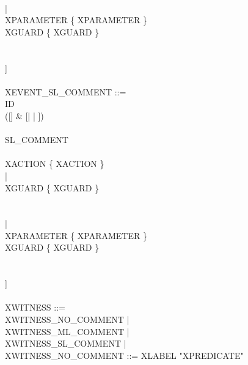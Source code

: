 \begin{center}
\begin{Bcode}
    \Btab \Btab {} \\
    \Btab \Btab \Btab | \\
    \Btab \Btab \Btab \Bany{} XPARAMETER \{ XPARAMETER \}\\
    \Btab \Btab \Btab \Bwhere{} XGUARD \{ XGUARD \}\\
    \Btab \Btab {} \\
    \Btab \Btab {} \\
    \Btab \Btab ]\\
    \Btab \Btab \Bend\\
    XEVENT\_SL\_COMMENT ::=\\
    \Btab \Btab ID \\
    \Btab \Btab ([\Bextended] \& [\Bordinary | \Bconvergent | \Banticipated])\\
    \Btab \Btab [\Brefines{} ID \{ ID \}]\\
    \Btab \Btab SL\_COMMENT\\
    \Btab \Btab [\\
    \Btab \Btab \Btab [\Bwith{} XWITNESS \{ XWITNESS \}] \\
    \Btab \Btab \Btab \Bbegin{} XACTION \{ XACTION \} \\
    \Btab \Btab \Btab | \\
    \Btab \Btab \Btab \Bwhen{} XGUARD \{ XGUARD \}\\
    \Btab \Btab {} \\
    \Btab \Btab {} \\
    \Btab \Btab \Btab | \\
    \Btab \Btab \Btab \Bany{} XPARAMETER \{ XPARAMETER \}\\
    \Btab \Btab \Btab \Bwhere{} XGUARD \{ XGUARD \}\\
    \Btab \Btab {} \\
    \Btab \Btab {} \\
    \Btab \Btab ]\\
    \Btab \Btab \Bend\\
    XWITNESS ::= \\
    \Btab \Btab XWITNESS\_NO\_COMMENT | \\
    \Btab \Btab XWITNESS\_ML\_COMMENT | \\
    \Btab \Btab XWITNESS\_SL\_COMMENT | \\
    XWITNESS\_NO\_COMMENT ::= XLABEL "XPREDICATE" \\

\end{Bcode}
\end{center}
